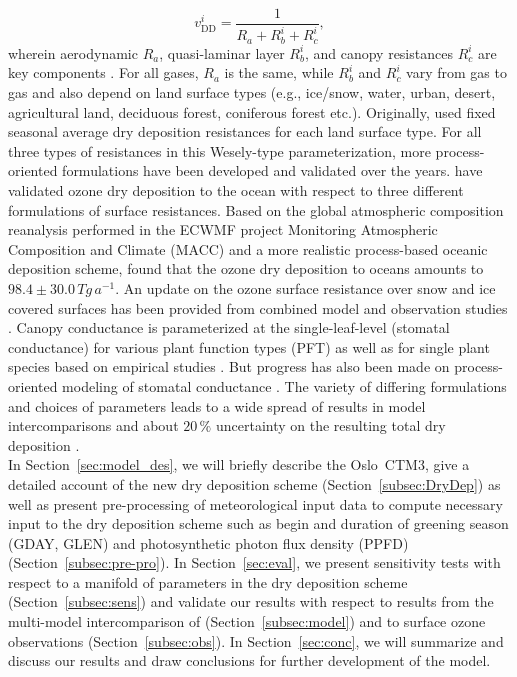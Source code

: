 \documentclass[gmd, manuscript]{copernicus}
\begin{document}
\begin{equation}
  v^i_\text{DD} = \frac{1}{R_a + R^i_b + R^i_c},
  \label{eq:drydep_velo}
\end{equation}
wherein aerodynamic $R_a$, quasi-laminar layer $R^i_b$, and canopy resistances $R^i_c$ are key components \citep{AE:Wesely1989,ACP:Seinfeld2006}. For all gases, $R_a$ is the same, while $R^i_b$ and $R^i_c$ vary from gas to gas and also depend on land surface types (e.g., ice/snow, water, urban, desert, agricultural land, deciduous forest, coniferous forest etc.). Originally, \citet{AE:Wesely1989} used fixed seasonal average dry deposition resistances for each land surface type. For all three types of resistances in this Wesely-type parameterization, more process-oriented formulations have been developed and validated over the years. \citet{ACP:Luhar2017} have validated ozone dry deposition to the ocean with respect to three different formulations of surface resistances.
Based on the global atmospheric composition reanalysis performed in the ECWMF project Monitoring Atmospheric Composition and Climate (MACC) and a more realistic process-based oceanic deposition scheme, \citet{ACP:Luhar2018} found that the ozone dry deposition to oceans amounts to $98.4 \pm 30.0\,\unit{Tg\,a^{-1}}$.
An update on the ozone surface resistance over snow and ice covered surfaces has been provided from combined model and observation studies \citep[][$v^\chem{O_3}_\text{ice/snow} = 1/10000\,\unit{m\,s^{-1}}$]{ACP:Helmig2007}. Canopy conductance is parameterized at the single-leaf-level (stomatal conductance) for various plant function types (PFT) as well as for single plant species based on empirical studies \citep{PTRS:Jarvis1976, BallBerry1987, ACP:Simpson2012, ICP:MappingManual2017}. But progress has also been made on process-oriented modeling of stomatal conductance \citep{AFM:Anderson2000,PP:Buckley2017}. The variety of differing formulations and choices of parameters leads to a wide spread of results in model intercomparisons \citep{ACP:Hardacre2015,AE:Derwent2018} and about $20\,\unit{\%}$ uncertainty on the resulting total dry deposition \citep{ACP:Monks2015}.\\

In Section~\ref{sec:model_des}, we will briefly describe the Oslo~CTM3, give a detailed account of the new dry deposition scheme (Section~\ref{subsec:DryDep}) as well as present pre-processing of meteorological input data to compute necessary input to the dry deposition scheme such as begin and duration of greening season (GDAY, GLEN) and photosynthetic photon flux density (PPFD) (Section~\ref{subsec:pre-pro}). In Section~\ref{sec:eval}, we present sensitivity tests with respect to a manifold of parameters in the dry deposition scheme (Section~\ref{subsec:sens}) and validate our results with respect to results from the multi-model intercomparison of \citet{ACP:Hardacre2015} (Section~\ref{subsec:model}) and to surface ozone observations (Section~\ref{subsec:obs}). In Section~\ref{sec:conc}, we will summarize and discuss our results and draw conclusions for further development of the model.
\end{document}
